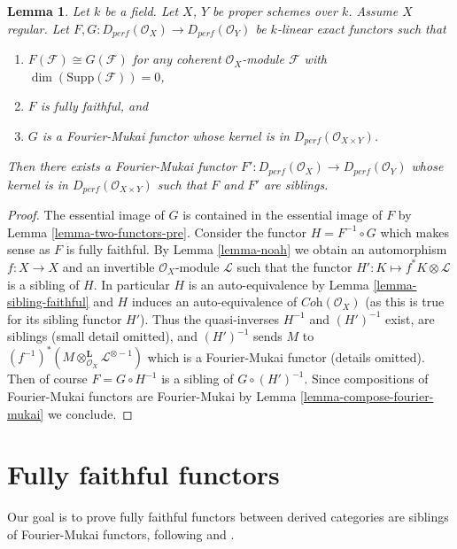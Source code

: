 \documentclass{stacks-project}
\theoremstyle{plain}
\newtheorem{lemma}[subsection]{Lemma}
\theoremstyle{definition}
\theoremstyle{remark}
\numberwithin{equation}{subsection}
\begin{document}
\begin{lemma}
\label{lemma-two-functors}
Let $k$ be a field. Let $X$, $Y$ be proper schemes over $k$.
Assume $X$ regular.
Let $F, G : D_{perf}(\mathcal{O}_X) \to D_{perf}(\mathcal{O}_Y)$
be $k$-linear exact functors such that
\begin{enumerate}
\item $F(\mathcal{F}) \cong G(\mathcal{F})$ for any coherent
$\mathcal{O}_X$-module $\mathcal{F}$ with $\dim(\text{Supp}(\mathcal{F})) = 0$,
\item $F$ is fully faithful, and
\item $G$ is a Fourier-Mukai functor whose kernel is in
$D_{perf}(\mathcal{O}_{X \times Y})$.
\end{enumerate}
Then there exists a Fourier-Mukai functor
$F' : D_{perf}(\mathcal{O}_X) \to D_{perf}(\mathcal{O}_Y)$
whose kernel is in $D_{perf}(\mathcal{O}_{X \times Y})$
such that $F$ and $F'$ are siblings.
\end{lemma}

\begin{proof}
The essential image of $G$ is contained in the essential
image of $F$ by Lemma \ref{lemma-two-functors-pre}.
Consider the functor $H = F^{-1} \circ G$
which makes sense as $F$ is fully faithful.
By Lemma \ref{lemma-noah} we obtain an automorphism $f : X \to X$
and an invertible $\mathcal{O}_X$-module $\mathcal{L}$ such that
the functor $H' : K \mapsto f^*K \otimes \mathcal{L}$
is a sibling of $H$. In particular
$H$ is an auto-equivalence by Lemma \ref{lemma-sibling-faithful}
and $H$ induces an auto-equivalence of
$\textit{Coh}(\mathcal{O}_X)$ (as this is true for its sibling functor $H'$).
Thus the quasi-inverses $H^{-1}$ and $(H')^{-1}$ exist, are siblings
(small detail omitted), and $(H')^{-1}$ sends $M$ to
$(f^{-1})^*(M \otimes_{\mathcal{O}_X}^\mathbf{L} \mathcal{L}^{\otimes -1})$
which is a Fourier-Mukai functor (details omitted).
Then of course $F = G \circ H^{-1}$ is a sibling of
$G \circ (H')^{-1}$. Since compositions of Fourier-Mukai
functors are Fourier-Mukai by
Lemma \ref{lemma-compose-fourier-mukai}
we conclude.
\end{proof}





\section{Fully faithful functors}
\label{section-fully-faithful}

\noindent
Our goal is to prove fully faithful functors between derived categories
are siblings of Fourier-Mukai functors, following
\cite{Orlov-K3} and \cite{Ballard}.
\end{document}
